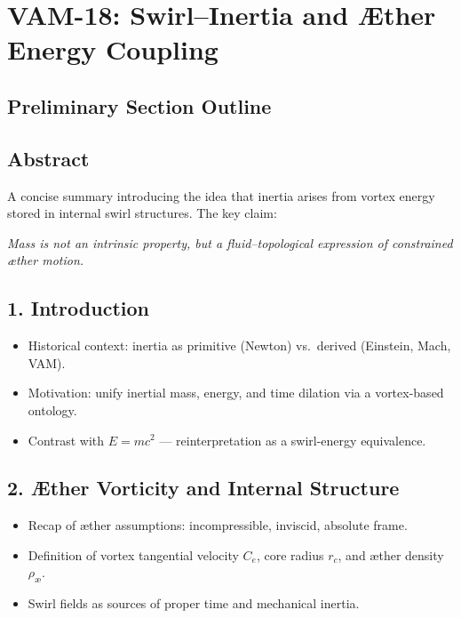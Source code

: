 
\section*{VAM-18: Swirl--Inertia and Æther Energy Coupling}

\subsection*{Preliminary Section Outline}

\subsection*{Abstract}

A concise summary introducing the idea that inertia arises from vortex energy stored in internal swirl structures. The key claim:

\textit{Mass is not an intrinsic property, but a fluid--topological expression of constrained æther motion.}

\subsection*{1. Introduction}

\begin{itemize}
    \item Historical context: inertia as primitive (Newton) vs.\ derived (Einstein, Mach, VAM).
    \item Motivation: unify inertial mass, energy, and time dilation via a vortex-based ontology.
    \item Contrast with $E=mc^2$ --- reinterpretation as a swirl-energy equivalence.
\end{itemize}

\subsection*{2. Æther Vorticity and Internal Structure}

\begin{itemize}
    \item Recap of æther assumptions: incompressible, inviscid, absolute frame.
    \item Definition of vortex tangential velocity $C_e$, core radius $r_c$, and æther density $\rho_\text{\ae}$.
    \item Swirl fields as sources of proper time and mechanical inertia.
\end{itemize}

